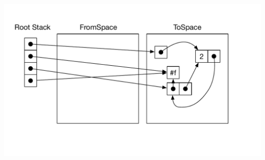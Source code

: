 \documentclass[12pt,answers]{exam}
\begin{document}
\begin{questions}
\begin{solution}
\includegraphics[width=6.5in]{copy-collect-soln}
\end{solution}

\end{questions}
\end{document}
